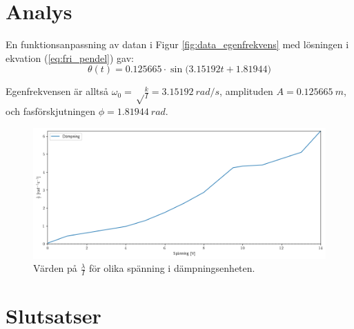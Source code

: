 \documentclass[12pt, a4paper]{article}
\begin{document}
\clearpage
\section{Analys}

En funktionsanpassning av datan i Figur \ref{fig:data_egenfrekvens} med lösningen i ekvation (\ref{eq:fri_pendel}) gav:
\begin{equation}
    \theta(t)=0.125665\cdot\sin\bigl(3.15192t+1.81944\bigr)
\end{equation}

Egenfrekvensen är alltså $\omega_0=\sqrt\frac{k}{I}=\SI{3.15192}{rad/s}$, amplituden $A=\SI{0.125665}{m}$, och fas\-förskjutningen $\phi=\SI{1.81944}{rad}$.

\begin{figure}[hp]
    \includegraphics[width=\textwidth]{graf_voltage_damping}
    \caption{Värden på $\frac{\lambda}{I}$ för olika spänning i dämpningsenheten.}
    \label{fig:dämpning_över_spänning}
\end{figure}

\section{Slutsatser}
\end{document}
